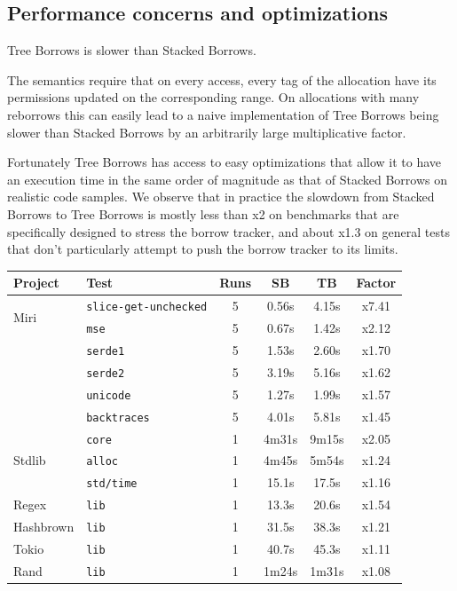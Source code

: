 \documentclass[a4paper,11pt]{article}
\theoremstyle{plain}
\theoremstyle{definition}
\theoremstyle{remark}
\begin{document}
\subsection{Performance concerns and optimizations}

Tree Borrows is slower than Stacked Borrows.

The semantics require that on every access, every tag of the allocation have its
permissions updated on the corresponding range. On allocations with many reborrows
this can easily lead to a naive implementation of Tree Borrows being slower than
Stacked Borrows by an arbitrarily large multiplicative factor.

Fortunately Tree Borrows has access to easy optimizations that allow it to have
an execution time in the same order of magnitude as that of Stacked Borrows on
realistic code samples. We observe that in practice the slowdown from Stacked Borrows
to Tree Borrows is mostly less than x2 on benchmarks that are specifically designed
to stress the borrow tracker, and about x1.3 on general tests that don't particularly attempt to
push the borrow tracker to its limits.


\begin{tabular}{|l|l|c|c|c|c|}
    \hline
    Project & Test & Runs & SB & TB & Factor \\
    \hline
    \multirow{2}{9em}{Miri}
        & \texttt{slice-get-unchecked} & 5 & 0.56s & 4.15s & {\color{Red}x7.41} \\
        & \texttt{mse} & 5 & 0.67s & 1.42s & {\color{Red}x2.12} \\
        & \texttt{serde1} & 5 & 1.53s & 2.60s & {\color{YellowOrange}x1.70} \\
        & \texttt{serde2} & 5 & 3.19s & 5.16s & {\color{YellowOrange}x1.62} \\
        & \texttt{unicode} & 5 & 1.27s & 1.99s & {\color{YellowOrange}x1.57} \\
        & \texttt{backtraces} & 5 & 4.01s & 5.81s & {\color{YellowOrange}x1.45} \\
    \hline
    \multirow{3}{9em}{Stdlib}
        & \texttt{core} & 1 & 4m31s & 9m15s & {\color{Red}x2.05} \\
        & \texttt{alloc} & 1 & 4m45s & 5m54s & {\color{LimeGreen}x1.24} \\
        & \texttt{std/time} & 1 & 15.1s & 17.5s & {\color{LimeGreen}x1.16} \\
    \hline
    \multirow{1}{9em}{Regex}
        & \texttt{lib} & 1 & 13.3s & 20.6s & {\color{YellowOrange}x1.54} \\
    \multirow{1}{9em}{Hashbrown}
        & \texttt{lib} & 1 & 31.5s & 38.3s & {\color{LimeGreen}x1.21} \\
    \multirow{1}{9em}{Tokio}
        & \texttt{lib} & 1 & 40.7s & 45.3s & {\color{LimeGreen}x1.11} \\
    \multirow{1}{9em}{Rand}
        & \texttt{lib} & 1 & 1m24s & 1m31s & {\color{LimeGreen}x1.08} \\
    \hline
\end{tabular}
\end{document}
